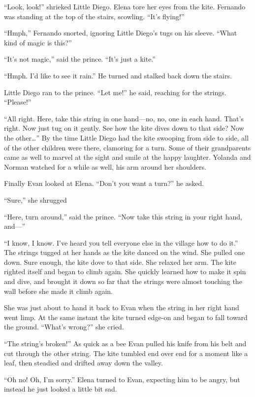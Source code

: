 \documentclass[10pt]{book}
\begin{document}
``Look, look!'' shrieked Little Diego. Elena tore her eyes from the kite. Fernando was standing at the top of the stairs, scowling. ``It's flying!''

``Hmph,'' Fernando snorted, ignoring Little Diego's tugs on his sleeve. ``What kind of magic is this?''

``It's not magic,'' said the prince. ``It's just a kite.''

``Hmph. I'd like to see it rain.'' He turned and stalked back down the stairs.

Little Diego ran to the prince. ``Let me!'' he said, reaching for the strings. ``Please!''

``All right. Here, take this string in one hand---no, no, one in each hand. That's right. Now just tug on it gently. See how the kite dives down to that side? Now the other{\ldots}''  By the time Little Diego had the kite swooping from side to side, all of the other children were there, clamoring for a turn. Some of their grandparents came as well to marvel at the sight and smile at the happy laughter. Yolanda and Norman watched for a while as well, his arm around her shoulders.

Finally Evan looked at Elena. ``Don't you want a turn?'' he asked.

``Sure,'' she shrugged

``Here, turn around,'' said the prince. ``Now take this string in your right hand, and---''

``I know, I know. I've heard you tell everyone else in the village how to do it.'' The strings tugged at her hands as the kite danced on the wind. She pulled one down. Sure enough, the kite dove to that side. She relaxed her arm. The kite righted itself and began to climb again. She quickly learned how to make it spin and dive, and brought it down so far that the strings were almost touching the wall before she made it climb again.

She was just about to hand it back to Evan when the string in her right hand went limp. At the same instant the kite turned edge-on and began to fall toward the ground. ``What's wrong?'' she cried.

``The string's broken!'' As quick as a bee Evan pulled his knife from his belt and cut through the other string. The kite tumbled end over end for a moment like a leaf, then steadied and drifted away down the valley.

``Oh no! Oh, I'm sorry.'' Elena turned to Evan, expecting him to be angry, but instead he just looked a little bit sad.
\end{document}

